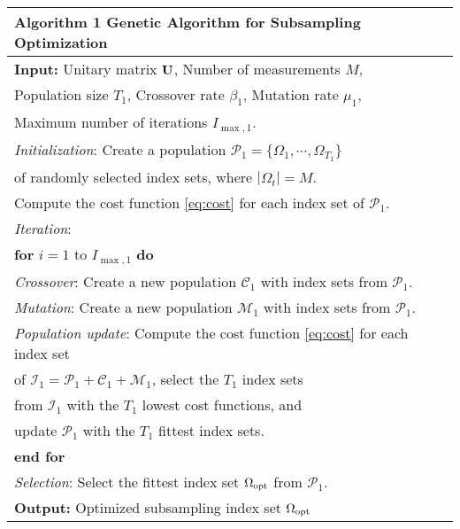 \documentclass[journal]{IEEEtran}
\newcommand{\mC}{\mathcal{C}}
\newcommand{\mI}{\mathcal{I}}
\newcommand{\mM}{\mathcal{M}}
\newcommand{\mP}{\mathcal{P}}
\newcommand{\Ubu}{{\bf U}}
\numberwithin{const2}{const}
\begin{document}
\begin{table}[!t]
	\fontsize{8}{10pt}\selectfont
	\centering
	\begin{tabular}{l}
		\hlineB{2.5}
		\textbf{Algorithm 1} Genetic Algorithm for Subsampling Optimization \\
		\hline
		\textbf{Input:} Unitary matrix $\Ubu$, Number of measurements $M$, \\ 
		        \qquad \quad Population size $T_1$, Crossover rate $\beta_1$, Mutation rate $\mu_{1}$,  \\
   		        \qquad \quad Maximum number of iterations $I_{\max, 1}$. \\
		\emph{Initialization}: Create a population $\mP_1 = \{ \Omega_1, \cdots, \Omega_{T_1}\}$  \\
		\qquad \qquad \qquad of randomly selected index sets, where $|\Omega_t| = M$.  \\		
		\qquad \qquad \qquad Compute the cost function \eqref{eq:cost} 
		for each index set of $\mP_1$. \\ 
		\emph{Iteration}:  \\
		\textbf{for} $i=1$ to $I_{\max, 1}$ \textbf{do}  \\
		\quad \emph{Crossover}: Create a new population $\mC_1$ with index sets from $\mP_1$. \\
		\quad \emph{Mutation}: Create a new population $\mM_1$ with index sets from $\mP_1$. \\
		\quad \emph{Population update}: Compute the cost function \eqref{eq:cost} for each index set \\ %
		\qquad \qquad \qquad \qquad \quad of $\mI_1 = \mP_1 + \mC_1+\mM_1$, select the $T_1$ index sets \\
		\qquad \qquad \qquad \qquad \quad from $\mI_1$ with the $T_1$ lowest cost functions, and \\
		\qquad \qquad \qquad \qquad \quad update $\mP_1$ with the $T_1$ fittest index sets. \\
		\textbf{end for} \\
		\emph{Selection}: Select the fittest index set $\Omega_{\rm opt}$ from $\mP_1$. \\ 
		\textbf{Output:} Optimized subsampling index set $\Omega_{\rm opt}$ \\
		\hline
	\end{tabular}
	\label{tb:ga}
\end{table}
\end{document}
